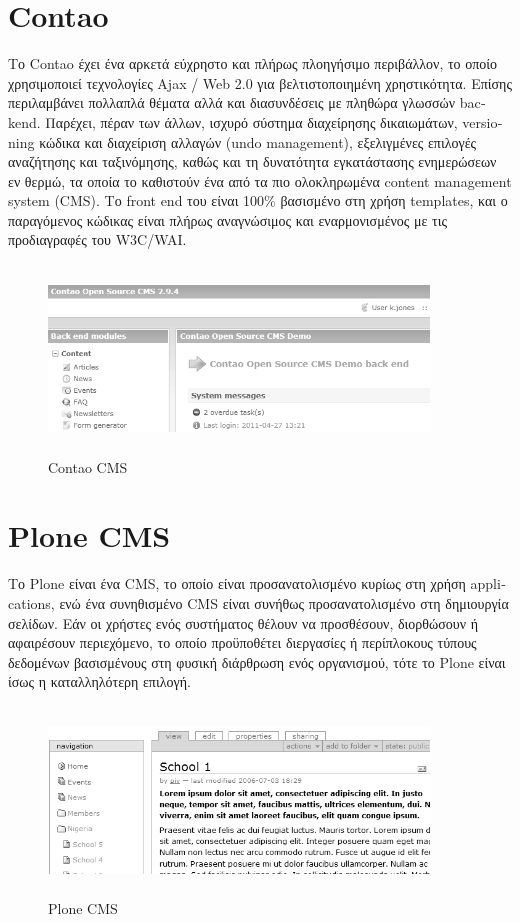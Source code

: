 \documentclass[12pt]{report}
\begin{document}
\section{\textlatin{Contao}}
Το \textlatin{Contao} έχει ένα αρκετά εύχρηστο και πλήρως πλοηγήσιμο περιβάλλον, το οποίο χρησιμοποιεί τεχνολογίες \textlatin{Ajax / Web 2.0} για βελτιστοποιημένη χρηστικότητα. Επίσης περιλαμβάνει πολλαπλά θέματα αλλά και διασυνδέσεις με πληθώρα γλωσσών \textlatin{backend}. Παρέχει, πέραν των άλλων, ισχυρό σύστημα διαχείρησης δικαιωμάτων, \textlatin{versioning} κώδικα και διαχείριση αλλαγών (\textlatin{undo management}), εξελιγμένες επιλογές αναζήτησης και ταξινόμησης, καθώς και τη δυνατότητα εγκατάστασης ενημερώσεων εν θερμώ, τα οποία το καθιστούν ένα από τα πιο ολοκληρωμένα \textlatin{content management system (CMS)}. Το \textlatin{front end} του είναι 100\% βασισμένο στη χρήση \textlatin{templates}, και ο παραγόμενος κώδικας είναι πλήρως αναγνώσιμος και εναρμονισμένος με τις προδιαγραφές του \textlatin{W3C/WAI}.
\begin{figure}[H]
\centering
\includegraphics[width=0.9\textwidth, height=5cm]{Contao-gray}
\caption{\textlatin{Contao CMS}}
\label{fig:contao}
\end{figure}

\section{\textlatin{Plone CMS}}
Το \textlatin{Plone} είναι ένα \textlatin{CMS}, το οποίο είναι προσανατολισμένο κυρίως στη χρήση \textlatin{applications}, ενώ ένα συνηθισμένο \textlatin{CMS} είναι συνήθως προσανατολισμένο στη δημιουργία σελίδων. Εάν οι χρήστες ενός συστήματος θέλουν να προσθέσουν, διορθώσουν ή αφαιρέσουν περιεχόμενο, το οποίο προϋποθέτει διεργασίες ή περίπλοκους τύπους δεδομένων βασισμένους στη φυσική διάρθρωση ενός οργανισμού, τότε το \textlatin{Plone} είναι ίσως η καταλληλότερη επιλογή.
\begin{figure}[H]
\centering
\includegraphics[width=0.9\textwidth, height=5cm]{plone_cms-gray}
\caption{\textlatin{Plone CMS}}
\label{fig:plone}
\end{figure}
\end{document}
